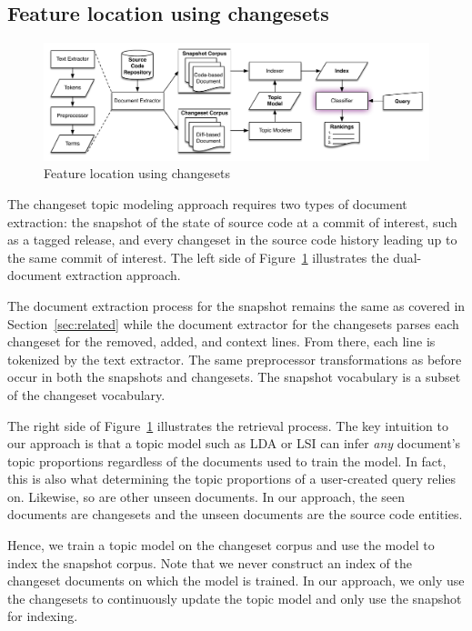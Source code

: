\subsection{Feature location using changesets}

\begin{figure}
\centerline{\includegraphics[width=.9\textwidth]{figures/changeset-flt}}
\caption{Feature location using changesets}
\label{fig:changeset}
\end{figure}

The changeset topic modeling approach requires two types of document extraction:
the snapshot of the state of source code at a commit of interest, such as
a tagged release, and every changeset in the source code history leading up to
the same commit of interest.  The left side of Figure~\ref{fig:changeset}
illustrates the dual-document extraction approach.

The document extraction process for the snapshot remains the same as covered in
Section~\ref{sec:related} while the document extractor for the changesets parses
each changeset for the removed, added, and context lines.  From there, each line
is tokenized by the text extractor.  The same preprocessor transformations as
before occur in both the snapshots and changesets.  The snapshot vocabulary is
a subset of the changeset vocabulary.

The right side of Figure~\ref{fig:changeset} illustrates the retrieval process.
The key intuition to our approach is that a topic model such as LDA or LSI can
infer \emph{any} document's topic proportions regardless of the documents used
to train the model.  In fact, this is also what determining the topic
proportions of a user-created query relies on. Likewise, so are other unseen
documents. In our approach, the seen documents are changesets and the unseen
documents are the source code entities.

Hence, we train a topic model on the changeset corpus and use the model to index
the snapshot corpus.  Note that we never construct an index of the changeset
documents on which the model is trained.  In our approach, we only use the
changesets to continuously update the topic model and only use the snapshot for
indexing.

